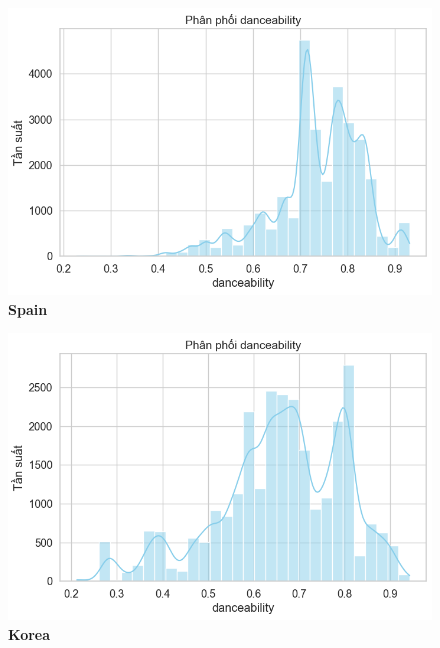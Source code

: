 \begin{itemize}
           \begin{figure}[H]
        \centering
        \begin{minipage}{0.395\textwidth}
            \centering
            \includegraphics[width=\linewidth]{../graphics/data_top50/figure/6/EDA_spain.png}
            \\[4pt] {\small \textbf{Spain}}
        \end{minipage}
        \hfill
        \begin{minipage}{0.395\textwidth}
            \centering
            \includegraphics[width=\linewidth]{../graphics/data_top50/figure/6/EDA_south_korea.png}
            \\[4pt] {\small \textbf{Korea}}
        \end{minipage}

        \vspace{0.4cm}


\end{figure}
\end{itemize}
